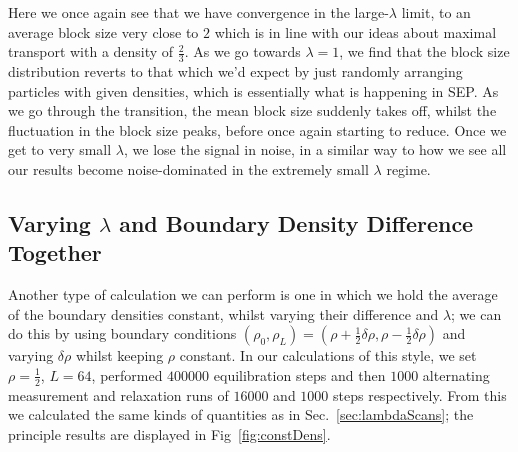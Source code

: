 Here we once again see that we have convergence in the large-$\lambda$ limit, to an average block
size very close to $2$ which is in line with our ideas about maximal transport with a density of 
$\frac{2}{3}$. As we go towards $\lambda=1$, we find that the block size distribution reverts to
that which we'd expect by just randomly arranging particles with given densities, which is essentially
what is happening in SEP. As we go through the transition, the mean block size suddenly takes off,
whilst the fluctuation in the block size peaks, before once again starting to reduce. Once we get to 
very small $\lambda$, we lose the signal in noise, in a similar way to how we see all our results become
noise-dominated in the extremely small $\lambda$ regime.


\subsection{Varying $\lambda$ and Boundary Density Difference Together} \label{sec:constDens}
Another type of calculation we can perform is one in which we hold the average of the boundary 
densities constant, whilst varying their difference and $\lambda$; we can do this by using boundary
conditions $(\rho_0, \rho_L)=(\rho + \frac{1}{2} \delta \rho , \rho - \frac{1}{2} \delta \rho)$ and 
varying $\delta \rho$ whilst keeping $\rho$ constant. In our calculations
of this style, we set $\rho=\frac{1}{2}$, $L=64$, performed $400000$ 
equilibration steps and then $1000$ alternating measurement and relaxation
runs of $16000$ and $1000$ steps respectively. From this we calculated
the same kinds of quantities as in Sec.~\ref{sec:lambdaScans}; the 
principle results are displayed in Fig~\ref{fig:constDens}.
